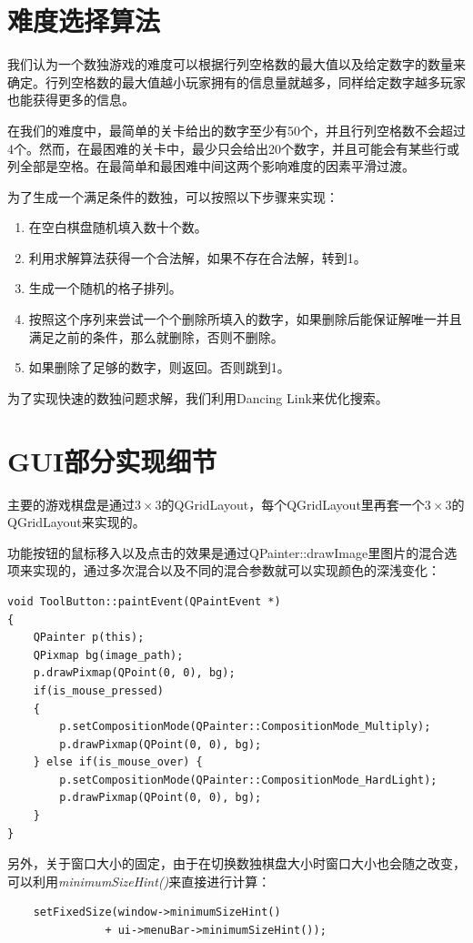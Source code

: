 \documentclass[11pt,a4paper]{article}
\begin{document}
\section{难度选择算法}
我们认为一个数独游戏的难度可以根据行列空格数的最大值以及给定数字的数量来确定。行列空格数的最大值越小玩家拥有的信息量就越多，同样给定数字越多玩家也能获得更多的信息。

在我们的难度中，最简单的关卡给出的数字至少有50个，并且行列空格数不会超过4个。然而，在最困难的关卡中，最少只会给出20个数字，并且可能会有某些行或列全部是空格。在最简单和最困难中间这两个影响难度的因素平滑过渡。

为了生成一个满足条件的数独，可以按照以下步骤来实现：

\begin{enumerate}
	\item 在空白棋盘随机填入数十个数。
	\item 利用求解算法获得一个合法解，如果不存在合法解，转到1。
	\item 生成一个随机的格子排列。
	\item 按照这个序列来尝试一个个删除所填入的数字，如果删除后能保证解唯一并且满足之前的条件，那么就删除，否则不删除。
	\item 如果删除了足够的数字，则返回。否则跳到1。
\end{enumerate}

为了实现快速的数独问题求解，我们利用Dancing Link来优化搜索。
\section{GUI部分实现细节}
主要的游戏棋盘是通过$3\times 3$的QGridLayout，每个QGridLayout里再套一个$3\times 3$的QGridLayout来实现的。

功能按钮的鼠标移入以及点击的效果是通过QPainter::drawImage里图片的混合选项来实现的，通过多次混合以及不同的混合参数就可以实现颜色的深浅变化：

\begin{verbatim}
void ToolButton::paintEvent(QPaintEvent *)
{
    QPainter p(this);
    QPixmap bg(image_path);
    p.drawPixmap(QPoint(0, 0), bg);
    if(is_mouse_pressed)
    {
        p.setCompositionMode(QPainter::CompositionMode_Multiply);
        p.drawPixmap(QPoint(0, 0), bg);
    } else if(is_mouse_over) {
        p.setCompositionMode(QPainter::CompositionMode_HardLight);
        p.drawPixmap(QPoint(0, 0), bg);
    }
}
\end{verbatim}

另外，关于窗口大小的固定，由于在切换数独棋盘大小时窗口大小也会随之改变，可以利用{\it minimumSizeHint()}来直接进行计算：

\begin{verbatim}
    setFixedSize(window->minimumSizeHint()
               + ui->menuBar->minimumSizeHint());
\end{verbatim}
\end{document}

